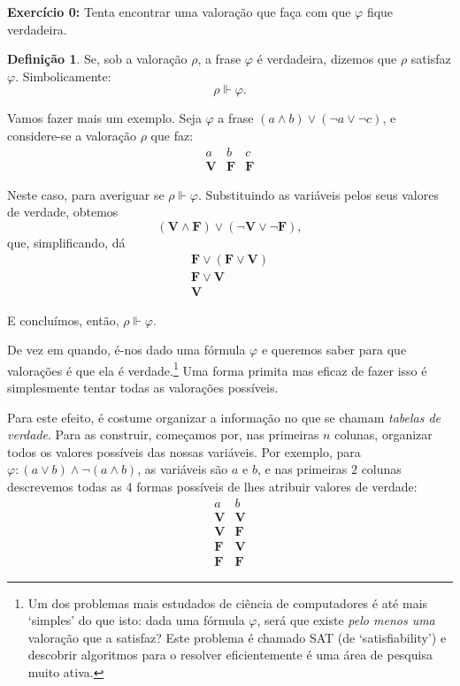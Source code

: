 \documentclass{article}
\theoremstyle{definition}
\newtheorem{definicao}{Definição}
\theoremstyle{remark}
\newcommand{\V}{\mathbf{V}}
\newcommand{\F}{\mathbf{F}}
\begin{document}
	\textbf{Exercício 0:} Tenta encontrar uma valoração que faça com que $\varphi$ fique verdadeira.
	
	\begin{definicao}
	Se, sob a valoração $\rho$, a frase $\varphi$ é verdadeira, dizemos que $\rho$ satisfaz $\varphi$. Simbolicamente:
	\[\rho \Vdash \varphi.\]
	\end{definicao}
	
	Vamos fazer mais um exemplo. Seja $\varphi$ a frase $(a \land b) \lor (\neg a \lor \neg c)$, e considere-se a valoração $\rho$ que faz:
	\[
	\begin{array}{c|c|c}
	a & b & c\\
	\hline
	\V & \F & \F
	\end{array}
	\]
	
	Neste caso, para averiguar se $\rho \Vdash \varphi$. Substituindo as variáveis pelos seus valores de verdade, obtemos
	\[(\V \land \F) \lor (\neg \V \lor \neg \F),\]
	que, simplificando, dá
	\begin{gather*}
	\F \lor (\F \lor \V)\\
	\F \lor \V\\
	\V
	\end{gather*}
	
	E concluímos, então, $\rho \Vdash \varphi$.
	
	\smallskip
	
	De vez em quando, é-nos dado uma fórmula $\varphi$ e queremos saber para que valorações é que ela é verdade.\footnote{Um dos problemas mais estudados de ciência de computadores é até mais `simples' do que isto: dada uma fórmula $\varphi$, será que existe \emph{pelo menos uma} valoração que a satisfaz? Este problema é chamado SAT (de `satisfiability') e descobrir algoritmos para o resolver eficientemente é uma área de pesquisa muito ativa.} Uma forma primita mas eficaz de fazer isso é simplesmente tentar todas as valorações possíveis.
	
	Para este efeito, é costume organizar a informação no que se chamam \emph{tabelas de verdade}. Para as construir, começamos por, nas primeiras $n$ colunas, organizar todos os valores possíveis das nossas variáveis. Por exemplo, para $\varphi: (a \lor b) \land \neg (a \land b)$, as variáveis são $a$ e $b$, e nas primeiras $2$ colunas descrevemos todas as 4 formas possíveis de lhes atribuir valores de verdade:
	\[
	\begin{array}{c|c}
	a & b\\
	\hline
	\V & \V\\
	\V & \F\\
	\F & \V\\
	\F & \F
	\end{array}
	\]
	
\end{document}
